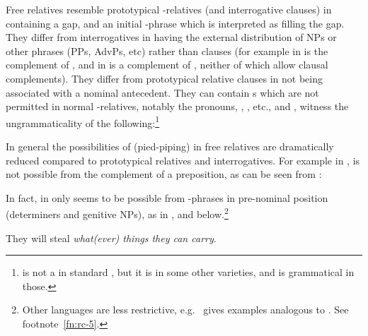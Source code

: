 \documentclass[output=paper,biblatex,babelshorthands,newtxmath,draftmode,colorlinks,citecolor=brown]{langscibook}
\begin{document}
Free relatives resemble prototypical -relatives (and interrogative clauses) in containing a
gap, and an initial -phrase which is interpreted as filling the gap.  They
differ from interrogatives in having  the external
distribution of NPs or other phrases (\eguk PPs, AdvPs, etc) rather than clauses (for example in   is the complement of , and in  
is a complement of , neither of which allow clausal complements). They differ
from prototypical relative clauses in not being associated with a nominal antecedent. They can
contain s which are not permitted in normal -relatives, notably the
 pronouns, , , etc., and , witness the
ungrammaticality of the following:\footnote{ is not a  in
  standard , but it is in some other varieties, and  is grammatical in
  those.}
\begin{exe}\ex\begin{xlist}\label{x:rc-144}
\end{xlist}\end{exe}
In general the possibilities of  (pied-piping) in free relatives are
dramatically reduced compared to prototypical relatives and interrogatives. For example in , 
 is not possible from the complement of a preposition, as can be seen
from :
\begin{exe}\ex\begin{xlist}
\end{xlist}\end{exe}
In fact, in    only seems to be possible from -phrases in pre-nominal position
(determiners and genitive NPs), as in , and  below.\footnote{Other
  languages are less restrictive, e.g.\ \citet[57]{Mueller99b} gives  examples
  analogous to . See footnote~\ref{fn:rc-5}.}
\begin{exe}\ex
  \label{x:rc-149} They will steal \emph{what(ever) things they can carry}.
\end{exe}
\end{document}
